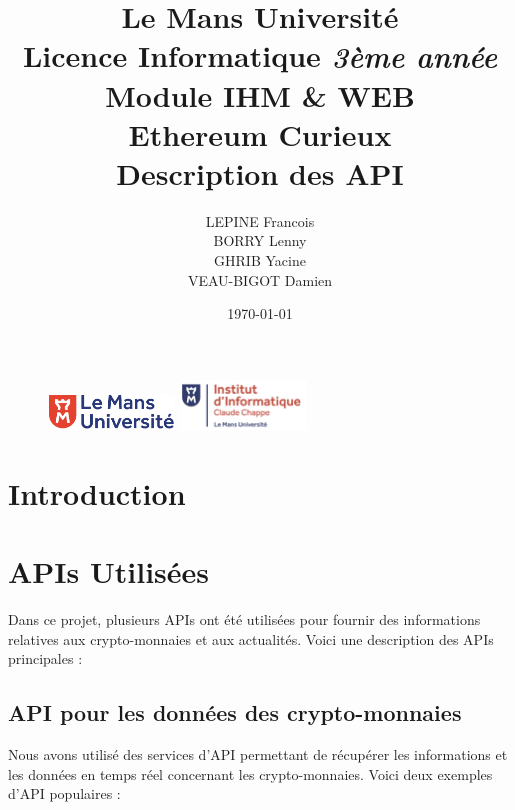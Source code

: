 \documentclass[a4paper,11pt]{article}
\begin{document}
\begin{figure}
\includegraphics[width=0.3\textwidth]{images/logolemansU.png}
\hspace{150pt} 
\includegraphics[width=0.3\textwidth]{images/logo_ic2.png} 
\end{figure}

\title{\textbf{\color{blue} Le Mans Universit\'e}\color{black}
\\ Licence Informatique \textit{3\`eme ann\'ee}
\\ Module IHM \& WEB
\\ Ethereum Curieux 
\\ \textbf{Description des API}} 
\author{LEPINE Francois\\BORRY Lenny\\GHRIB Yacine\\VEAU-BIGOT Damien}
\date{\today} 
\maketitle 
\newpage

\tableofcontents
\newpage

\section{Introduction}

\section{APIs Utilis\'ees}
Dans ce projet, plusieurs APIs ont été utilisées pour fournir des informations relatives aux crypto-monnaies et aux actualités. Voici une description des APIs principales :

\subsection{API pour les données des crypto-monnaies}
Nous avons utilisé des services d'API permettant de récupérer les informations et les données en temps réel concernant les crypto-monnaies. Voici deux exemples d'API populaires :
\end{document}
